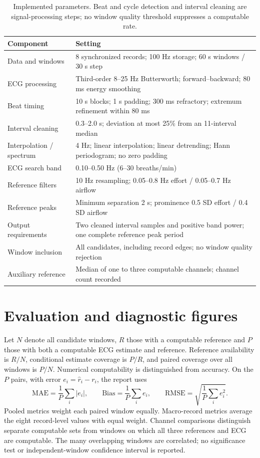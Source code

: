 \begin{table}[htbp]
\centering\small
\caption{Implemented parameters. Beat and cycle detection and interval cleaning are signal-processing steps; no window quality threshold suppresses a computable rate.}
\label{tab:parameters}
\begin{tabularx}{\textwidth}{@{}p{}Y@{}}
\toprule
Component & Setting \\
\midrule
Data and windows & 8 synchronized records; 100 Hz storage; 60 s windows / 30 s step \\
ECG processing & Third-order 8--25 Hz Butterworth; forward--backward; 80 ms energy smoothing \\
Beat timing & 10 s blocks; 1 s padding; 300 ms refractory; extremum refinement within 80 ms \\
Interval cleaning & 0.3--2.0 s; deviation at most 25\% from an 11-interval median \\
Interpolation / spectrum & 4 Hz; linear interpolation; linear detrending; Hann periodogram; no zero padding \\
ECG search band & 0.10--0.50 Hz (6--30 breaths/min) \\
Reference filters & 10 Hz resampling; 0.05--0.8 Hz effort / 0.05--0.7 Hz airflow \\
Reference peaks & Minimum separation 2 s; prominence 0.5 SD effort / 0.4 SD airflow \\
Output requirements & Two cleaned interval samples and positive band power; one complete reference peak period \\
Window inclusion & All candidates, including record edges; no window quality rejection \\
Auxiliary reference & Median of one to three computable channels; channel count recorded \\
\bottomrule
\end{tabularx}
\end{table}

\section{Evaluation and diagnostic figures}
Let $N$ denote all candidate windows, $R$ those with a computable reference and $P$ those with both a computable ECG estimate and reference. Reference availability is $R/N$, conditional estimate coverage is $P/R$, and paired coverage over all windows is $P/N$. Numerical computability is distinguished from accuracy. On the $P$ pairs, with error $e_i=\widehat r_i-r_i$, the report uses
\begin{equation}
\mathrm{MAE}=\frac{1}{P}\sum_i|e_i|,\qquad
\mathrm{Bias}=\frac{1}{P}\sum_ie_i,\qquad
\mathrm{RMSE}=\sqrt{\frac{1}{P}\sum_ie_i^2}.
\end{equation}
Pooled metrics weight each paired window equally. Macro-record metrics average the eight record-level values with equal weight. Channel comparisons distinguish separate computable sets from windows on which all three references and ECG are computable. The many overlapping windows are correlated; no significance test or independent-window confidence interval is reported.

